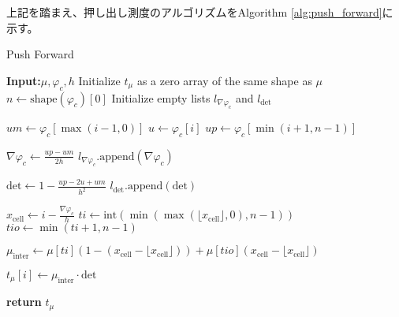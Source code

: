 上記を踏まえ、押し出し測度のアルゴリズムをAlgorithm \ref{alg:push_forward}に示す。
\begin{algorithm}
    \caption{Push Forward}
    \label{alg:push_forward}
    \begin{algorithmic}[1]
        \State \textbf{Input:}{$\mu, \varphi_c, h$}
        \State Initialize $t_\mu$ as a zero array of the same shape as $\mu$
        \State $n \gets \text{shape}(\varphi_c)[0]$
        \State Initialize empty lists $l_{\nabla\varphi_c}$ and $l_{\text{det}}$
        
            \State $um \gets \varphi_c[\max(i-1, 0)]$
            \State $u \gets \varphi_c[i]$
            \State $up \gets \varphi_c[\min(i+1, n-1)]$
            
            \State $\nabla\varphi_c \gets \frac{up - um}{2h}$
            \State $l_{\nabla\varphi_c}.\text{append}(\nabla\varphi_c)$
            
            \State $\text{det} \gets 1 - \frac{up - 2u + um}{h^2}$
            \State $l_{\text{det}}.\text{append}(\text{det})$
            
            \State $x_{\text{cell}} \gets i - \frac{\nabla\varphi_c}{h}$
            \State $ti \gets \text{int}(\min(\max(\lfloor x_{\text{cell}} \rfloor, 0), n - 1))$
            \State $tio \gets \min(ti + 1, n - 1)$
            
            \State $\mu_{\text{inter}} \gets \mu[ti] \left(1 - (x_{\text{cell}} - \lfloor x_{\text{cell}} \rfloor)\right) + \mu[tio] \left(x_{\text{cell}} - \lfloor x_{\text{cell}} \rfloor\right)$
            
            \State $t_\mu[i] \gets \mu_{\text{inter}} \cdot \text{det}$
        \EndFor
        
        \State \textbf{return} $t_\mu$
    \end{algorithmic}
\end{algorithm}


